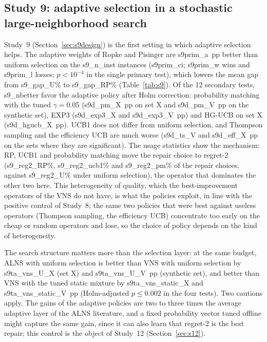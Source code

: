 \subsection{Study 9: adaptive selection in a stochastic large-neighborhood search}\label{sec:s9}
Study~9 (Section~\ref{sec:s9design}) is the first setting in which adaptive selection helps. The adaptive weights of Ropke and Pisinger are \num{s9prim_a}~pp better than uniform selection on the \num{s9_n_inst} instances (\num{s9prim_ci}; \num{s9prim_w} wins and \num{s9prim_l} losses; $p<10^{-4}$ in the single primary test), which lowers the mean gap from \num{s9_gap_U}\% to \num{s9_gap_RP}\% (Table~\ref{tab:s9}). Of the 12 secondary tests, \num{s9_nbetter} favor the adaptive policy after Holm correction: probability matching with the tuned $\gamma=0.05$ (\num{s9d_pm_X}~pp on set X and \num{s9d_pm_V}~pp on the synthetic set), EXP3 (\num{s9d_exp3_X} and \num{s9d_exp3_V}~pp) and HG-UCB on set X (\num{s9d_hgucb_X}~pp). UCB1 does not differ from uniform selection, and Thompson sampling and the efficiency UCB are much worse (\num{s9d_ts_V} and \num{s9d_eff_X}~pp on the sets where they are significant). The usage statistics show the mechanism: RP, UCB1 and probability matching move the repair choice to regret-2 (\num{s9_reg2_RP}\%, \num{s9_reg2_ucb1}\% and \num{s9_reg2_pm}\% of the repair choices, against \num{s9_reg2_U}\% under uniform selection), the operator that dominates the other two here. This heterogeneity of quality, which the best-improvement operators of the VNS do not have, is what the policies exploit, in line with the positive control of Study~8; the same two policies that were best against useless operators (Thompson sampling, the efficiency UCB) concentrate too early on the cheap or random operators and lose, so the choice of policy depends on the kind of heterogeneity.



The search structure matters more than the selection layer: at the same budget, ALNS with uniform selection is better than VNS with uniform selection by \num{s9ta_vns_U_X} (set X) and \num{s9ta_vns_U_V}~pp (synthetic set), and better than VNS with the tuned static mixture by \num{s9ta_vns_static_X} and \num{s9ta_vns_static_V}~pp (Holm-adjusted $p\le0.002$ in the four tests). Two cautions apply. The gains of the adaptive policies are two to three times the average adaptive layer of the ALNS literature, and a fixed probability vector tuned offline might capture the same gain, since it can also learn that regret-2 is the best repair; this control is the object of Study~12 (Section~\ref{sec:s12}).

